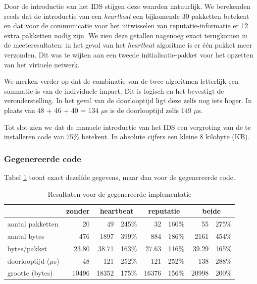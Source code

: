 Door de introductie van het IDS stijgen deze waarden natuurlijk. We berekenden
reeds dat de introductie van een \emph{heartbeat} een bijkomende 30 pakketten
betekent en dat voor de communicatie voor het uitwisselen van
reputatie-informatie er 12 extra pakketten nodig zijn. We zien deze getallen
nagenoeg exact terugkomen in de meeteresultaten: in het geval van het
\emph{heartbeat} algoritme is er \'e\'en pakket meer verzonden. Dit was te
wijten aan een tweede initialisatie-pakket voor het opzetten van het virtuele
netwerk.

We merken verder op dat de combinatie van de twee algoritmen letterlijk een
sommatie is van de individuele impact. Dit is logisch en het bevestigt de
veronderstelling. In het geval van de doorlooptijd ligt deze zelfs nog iets
hoger. In plaats van 48 + 46 + 40 = 134 $\mu$s is de doorlooptijd zelfs 149
$\mu$s.

Tot slot zien we dat de manuele introductie van het IDS een vergroting van de
te installeren code van 75\% betekent. In absolute cijfers een kleine 8
kilobyte (KB).

\vspace{-3mm}

\subsubsection{Gegenereerde code}

Tabel \ref{tbl:generated} toont exact dezelfde gegevens, maar dan voor de
gegenereerde code.

\begin{table}[H]
  \centering
  \begin{tabular}{l|r|rr|rr|rr}
  \hline
      & zonder & \multicolumn{2}{c|}{heartbeat} & \multicolumn{2}{c|}{reputatie} & \multicolumn{2}{c}{beide} \\
  \hline
  \hline
  
aantal pakketten      &    20	   &    49	  & 245\%	&    32	   & 160\% &    55	  & 275\% \\
aantal bytes          &   476	   &  1897	  & 399\%	&   884	   & 186\% &  2161	  & 454\% \\
bytes/pakket          &    23.80 &  	38.71	& 163\%	&    27.63 & 116\% &    39.29	& 165\% \\
doorlooptijd ($\mu$s) &    48    &   121	  & 252\%	&   121	   & 252\% &   138	  & 288\% \\
grootte (bytes)       &	10496	   & 18352	  & 175\%	& 16376	   & 156\% & 20998	  & 200\% \\

  \hline
  \end{tabular}
  \caption{Resultaten voor de gegenereerde implementatie}
  \label{tbl:generated}
\end{table}

